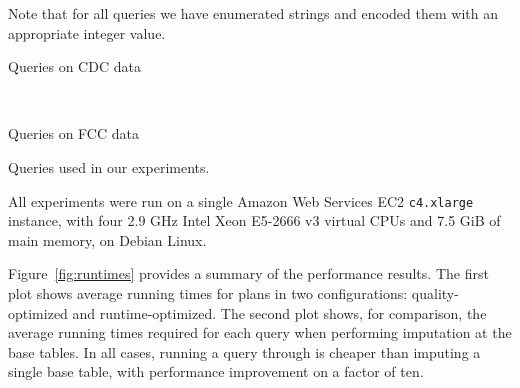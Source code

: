 Note that for all queries we have enumerated strings and encoded them with
an appropriate integer value.

\begin{table}
\centering
 \begin{subtable}{\linewidth}
  
  \caption{Queries on CDC data}
  \label{fig:queries-cdc}
 \end{subtable}
 ~
 \begin{subtable}{\linewidth}
 
 \caption{Queries on FCC data}
 \label{fig:queries-fcc}
 \end{subtable}
  \caption{Queries used in our experiments.}
  \label{fig:queries}
\end{table}

%  

All experiments were run on a single Amazon Web Services EC2 {\tt c4.xlarge} instance, with
four 2.9 GHz Intel Xeon E5-2666 v3 virtual CPUs and 7.5 GiB of main memory, on Debian Linux.

Figure~\ref{fig:runtimes} provides a summary of the performance results. The first plot
shows average running times for \ProjectName{} plans in two configurations:
quality-optimized and runtime-optimized. The second plot shows, for comparison, the average
running times required for each query when performing imputation at the base tables.  In all
cases, running a query through \ProjectName{} is cheaper than imputing a single base table,
with performance improvement on a factor of ten.

